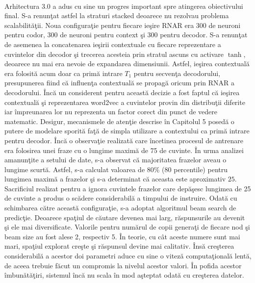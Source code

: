 \paragraph{}
Arhitectura 3.0 a adus cu sine un progres important spre atingerea obiectivului final. S-a renun\c tat astfel la straturi stacked deoarece nu rezolvau problema scalabilit\u a\c tii. Noua configura\c tie pentru fiecare ie\c sire RNAR era 300 de neuroni pentru codor, 300 de neuroni pentru context \c si 300 pentru decodor. S-a renun\c tat de asemenea la concatenarea ie\c sirii contextuale cu fiecare reprezentare a cuvintelor din decodor \c si trecerea acesteia prin stratul ascuns cu activare \(\tanh\), deoarece nu mai era nevoie de expandarea dimensiunii. Astfel, ie\c sirea contextual\u a era folosit\u a acum doar ca prim\u a intrare \(T_1\) pentru secven\c ta decodorului, presupunerea fiind c\u a influen\c ta contextual\u a se propag\u a oricum prin RNAR a decodorului. \^ Inc\u a un considerent pentru aceast\u a decizie a fost faptul c\u a ie\c sirea contextual\u a \c si reprezentarea word2vec a cuvintelor provin din distribu\c tii diferite iar \^ impreunarea lor nu reprezenta un factor corect din punct de vedere matematic. Desigur, mecanismele de aten\c tie descrise \^ in Capitolul 5 posed\u a o putere de modelare sporit\u a fa\c t\u a de simpla utilizare a contextului ca prim\u a intrare pentru decodor. \^ Inc\u a o observa\c tie realizat\u a care \^ incetinea procesul de antrenare era folosirea unei fraze cu o lungime maxim\u a de 75 de cuvinte. \^ In urma analizei amanun\c tite a setului de date, s-a observat c\u a majoritatea frazelor aveau o lungime scurt\u a. Astfel, s-a calculat valoarea de \(80\%\) (80 percentile) \cite{johnson2007elementary} pentru lungimea maxim\u a a frazelor \c si s-a determinat c\u a aceasta este aproximativ \(25\). Sacrificiul realizat pentru a ignora cuvintele frazelor care dep\u a\c sesc lungimea de 25 de cuvinte a produs o sc\u adere considerabil\u a a timpului de instruire. Odat\u a cu schimbarea c\u atre aceast\u a configura\c tie, s-a adoptat algoritmul beam search de predic\c tie. Deoarece spa\c tiul de c\u autare devenea mai larg, r\u aspunsurile au devenit \c si ele mai diversificate. Valorile pentru num\u arul de copii genera\c ti de fiecare nod \c si beam size au fost alese 2, respectiv 5. \^ In teorie, cu c\^ at aceste numere sunt mai mari, spa\c tiul explorat cre\c ste \c si r\u aspunsul devine mai calitativ. \^ Ins\u a cre\c sterea considerabil\u a a acestor doi parametri aduce cu sine o vitez\u a computa\c tional\u a lent\u a, de aceea trebuie f\u acut un compromis la nivelul acestor valori. \^ In pofida acestor \^ imbun\u at\u a\c tiri, sistemul \^ inc\u a nu scala \^ in mod a\c steptat odat\u a cu cre\c sterea datelor.

